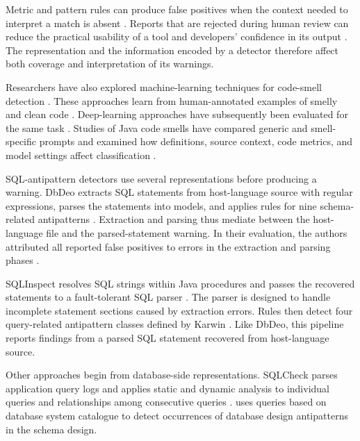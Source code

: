 Metric and pattern rules can produce false positives when the context needed to interpret a match is absent . Reports that are rejected during human review can reduce the practical usability of a tool and developers' confidence in its output . The representation and the information encoded by a detector therefore affect both coverage and interpretation of its warnings.

Researchers have also explored machine-learning techniques for code-smell detection . These approaches learn from human-annotated examples of smelly and clean code . Deep-learning approaches have subsequently been evaluated for the same task . Studies of Java code smells have compared generic and smell-specific prompts  and examined how definitions, source context, code metrics, and model settings affect classification .

SQL-antipattern detectors use several representations before producing a warning. DbDeo extracts SQL statements from host-language source with regular expressions, parses the statements into models, and applies rules for nine schema-related antipatterns . Extraction and parsing thus mediate between the host-language file and the parsed-statement warning. In their evaluation, the authors attributed all reported false positives to errors in the extraction and parsing phases .

SQLInspect resolves SQL strings within Java procedures and passes the recovered statements to a fault-tolerant SQL parser . The parser is designed to handle incomplete statement sections caused by extraction errors. Rules then detect four query-related antipattern classes defined by Karwin . Like DbDeo, this pipeline reports findings from a parsed SQL statement recovered from host-language source.

Other approaches begin from database-side representations. SQLCheck parses application query logs and applies static and dynamic analysis to individual queries and relationships among consecutive queries .  \textcite{eessaar2022,eessaar2023} uses queries based on database system catalogue to detect occurrences of database design antipatterns in the schema design.

